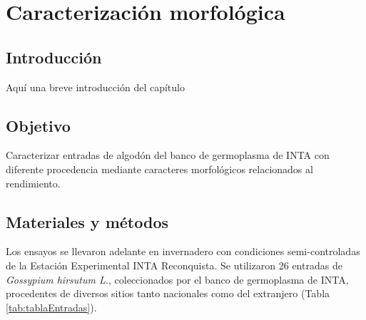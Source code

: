 \documentclass[12pt,oneside]{reedthesis}
\begin{document}
\chapter{Caracterización morfológica}\label{rmd-basics}

\section{Introducción}\label{introducciuxf3n-1}

Aquí una breve introducción del capítulo\\

\section{Objetivo}\label{objetivo}

Caracterizar entradas de algodón del banco de germoplasma de INTA con diferente procedencia mediante caracteres morfológicos relacionados al rendimiento.

\section{Materiales y métodos}\label{materiales-y-muxe9todos}

Los ensayos se llevaron adelante en invernadero con condiciones semi-controladas de la Estación Experimental INTA Reconquista. Se utilizaron 26 entradas de \emph{Gossypium hirsutum L.}, coleccionados por el banco de germoplasma de INTA, procedentes de diversos sitios tanto nacionales como del extranjero (Tabla \ref{tab:tablaEntradas}).
\end{document}
